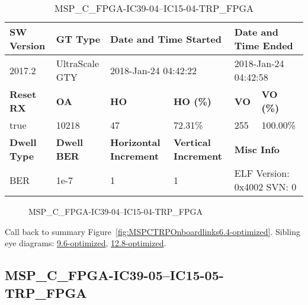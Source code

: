 \begin{table}[h]
\centering
\caption{MSP\_C\_FPGA-IC39-04--IC15-04-TRP\_FPGA}
\label{tab:MSPCFPGAIC3904IC1504TRPFPGA6.4-optimized}
\begin{tabular}{@{}|l|l|l|l|l|l|@{}}
\toprule
\textbf{SW Version}                & \textbf{GT Type}   & \multicolumn{2}{l|}{\textbf{Date and Time Started}}            & \multicolumn{2}{l|}{\textbf{Date and Time Ended}}        \\ \midrule
2017.2                       & UltraScale GTY          & \multicolumn{2}{l|}{2018-Jan-24 04:42:22}                   & \multicolumn{2}{l|}{2018-Jan-24 04:42:58}               \\ \midrule
\textbf{Reset RX}                  & \textbf{OA} & \textbf{HO}   & \textbf{HO (\%)} & \textbf{VO} & \textbf{VO (\%)} \\ \midrule
true & 10218        & 47          & 72.31\%        & 255        & 100.00\%       \\ \midrule
\textbf{Dwell Type}                & \textbf{Dwell BER} & \textbf{Horizontal Increment} & \textbf{Vertical Increment}    & \multicolumn{2}{l|}{\textbf{Misc Info}}                  \\ \midrule
BER                            & 1e-7        & 1        & 1           & \multicolumn{2}{l|}{ELF Version: 0x4002 SVN: 0}                         \\ \bottomrule
\end{tabular}
\end{table}

\begin{figure}[h]
\caption{MSP\_C\_FPGA-IC39-04--IC15-04-TRP\_FPGA} \label{fig:MSPCFPGAIC3904IC1504TRPFPGA6.4-optimized}
\end{figure}

Call back to summary Figure~\ref{fig:MSPCTRPOnboardlinks6.4-optimized}.
Sibling eye diagrams: \hyperref[sec:MSPCFPGAIC3904IC1504TRPFPGA9.6-optimized]{9.6-optimized}, \hyperref[sec:MSPCFPGAIC3904IC1504TRPFPGA12.8-optimized]{12.8-optimized}.

\clearpage
\newpage


\subsection{MSP\_C\_FPGA-IC39-05--IC15-05-TRP\_FPGA}\label{sec:MSPCFPGAIC3905IC1505TRPFPGA6.4-optimized}

